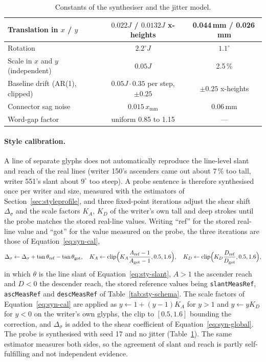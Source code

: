 \begin{table}[!htbp]
\begin{tabularx}{\linewidth}{|X|c|c|}
\hline
Translation in $x$ / $y$ & $0.022J$ / $0.0132J$ x-heights & 0.044\,mm / 0.026\,mm \\
\hline
Rotation & $2.2^\circ J$ & $1.1^\circ$ \\
\hline
Scale in $x$ and $y$ (independent) & $0.05J$ & 2.5\,\% \\
\hline
Baseline drift (AR(1), clipped) & $0.05J\cdot0.35$ per step, $\pm0.25$ & $\pm0.25$ x-heights \\
\hline
Connector sag noise & $0.015\,x_{\mathrm{mm}}$ & 0.06\,mm \\
\hline
Word-gap factor & uniform 0.85 to 1.15 & --- \\
\hline
\end{tabularx}
\caption{Constants of the synthesiser and the jitter model.}
\label{tab:syn-const}
\end{table}

\paragraph{Style calibration.}
\label{sec:syn-cal}
A line of separate glyphs does not automatically reproduce the line-level slant and reach of the real lines (writer 150's ascenders came out about 7\,\% too tall, writer 551's slant about $9^\circ$ too steep).
A probe sentence is therefore synthesised once per writer and size, measured with the estimators of Section~\ref{sec:styleprofile}, and three fixed-point iterations adjust the shear shift $\Delta_\sigma$ and the scale factors $K_A$, $K_D$ of the writer's own tall and deep strokes until the probe matches the stored real-line values.
Writing ``ref'' for the stored real-line value and ``got'' for the value measured on the probe, the three iterations are those of Equation~\ref{eq:syn-cal},
\begin{equation}
\Delta_\sigma\leftarrow\Delta_\sigma+\tan\theta_{\mathrm{ref}}-\tan\theta_{\mathrm{got}},\quad K_A\leftarrow\operatorname{clip}\Bigl(K_A\frac{A_{\mathrm{ref}}-1}{A_{\mathrm{got}}-1},0.5,1.6\Bigr),\quad K_D\leftarrow\operatorname{clip}\Bigl(K_D\frac{D_{\mathrm{ref}}}{D_{\mathrm{got}}},0.5,1.6\Bigr),
\label{eq:syn-cal}
\end{equation}
in which $\theta$ is the line slant of Equation~\ref{eq:sty-slant}, $A>1$ the ascender reach and $D<0$ the descender reach, the stored reference values being \texttt{slantMeasRef}, \texttt{ascMeasRef} and \texttt{descMeasRef} of Table~\ref{tab:sty-schema}.
The scale factors of Equation~\ref{eq:syn-cal} are applied as $y\leftarrow1+(y-1)K_A$ for $y>1$ and $y\leftarrow yK_D$ for $y<0$ on the writer's own glyphs, the clip to $[0.5,1.6]$ bounding the correction, and $\Delta_\sigma$ is added to the shear coefficient of Equation~\ref{eq:syn-global}.
The probe is synthesised with seed 17 and no jitter (Table~\ref{tab:syn-const}).
The same estimator measures both sides, so the agreement of slant and reach is partly self-fulfilling and not independent evidence.

